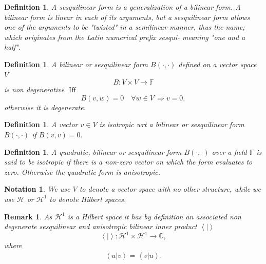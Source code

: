 \documentclass[aps,preprint]{revtex4}%
\newtheorem{definition}[theorem]{Definition}
\newtheorem{notation}[theorem]{Notation}
\newtheorem{remark}[theorem]{Remark}
\begin{document}
\begin{definition}
A \emph{sesquilinear} form is a generalization of a bilinear form. A
\emph{bilinear} form is linear in each of its arguments, but a sesquilinear
form allows one of the arguments to be "twisted" in a semilinear manner, thus
the name; which originates from the Latin numerical prefix sesqui- meaning
"one and a half".
\end{definition}

\begin{definition}
A bilinear or sesquilinear form $B\left(  \cdot,\cdot\right)  $ defined on a
vector space $V$
\begin{equation}
B:V\times V\rightarrow\mathbb{F}%
\end{equation}
is \emph{non degenerative} $\operatorname*{Iff}$
\begin{equation}
B\left(  v,w\right)  =0\quad\forall w\in V\,\Rightarrow v=0,
\end{equation}
otherwise it is \emph{degenerate}.
\end{definition}

\begin{definition}
A vector $v\in V$ is \emph{isotropic} wrt a bilinear or sesquilinear form
$B\left(  \cdot,\cdot\right)  $ if $B\left(  v,v\right)  =0.$
\end{definition}

\begin{definition}
A quadratic, bilinear or sesquilinear form $B\left(  \cdot,\cdot\right)  $
over a field $\mathbb{F}$ is said to be \emph{isotropic} if there is a
non-zero vector on which the form evaluates to zero. Otherwise the quadratic
form is \emph{anisotropic.}
\end{definition}

\begin{notation}
We use $V$ to denote a vector space with no other structure, while we use
$\mathcal{H}$ or $\mathcal{H}^{1}$ to denote Hilbert spaces.
\end{notation}

\begin{remark}
As $\mathcal{H}^{1}$ is a Hilbert space it has by definition an associated
\emph{non degenerate sesquilinear} \emph{and} \emph{anisotropic bilinear inner
product} $\left\langle \left.  {}\right\vert \right\rangle $%
\begin{equation}
\left\langle \left.  {}\right\vert \right\rangle :\mathcal{H}^{1}%
\times\mathcal{H}^{1}\rightarrow\mathbb{C},
\end{equation}
where
\begin{equation}
\left\langle \left.  u\right\vert v\right\rangle =\overline{\left\langle
\left.  v\right\vert u\right\rangle }.
\end{equation}

\end{remark}
\end{document}

